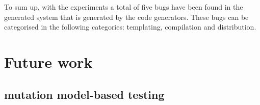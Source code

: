 To sum up, with the experiments a total of five bugs have been found in the
generated system that is generated by the code generators.
These bugs can be categorised in the following categories: templating,
compilation and distribution.

\section{Future work}

\subsection{mutation model-based testing}
